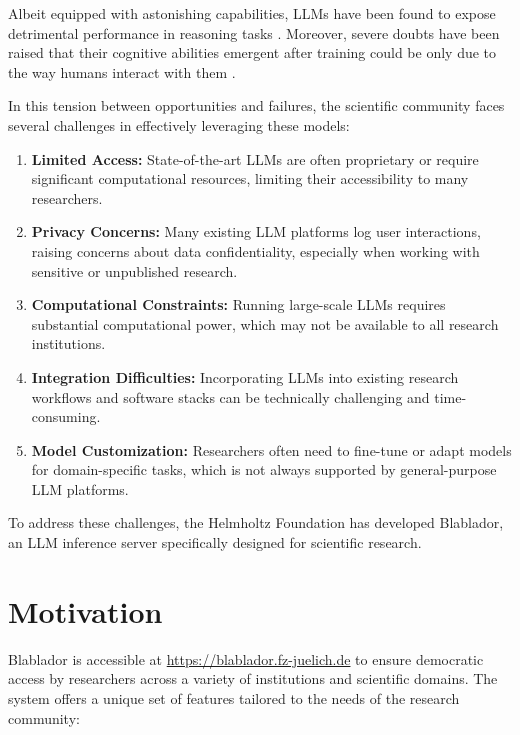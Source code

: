 \documentclass[10pt,conference]{IEEEtran}
\begin{document}
Albeit equipped with astonishing capabilities, LLMs have been found to expose detrimental performance in reasoning tasks \cite{nezhurina2024alicewonderlandsimpletasks}. Moreover, severe doubts have been raised that their cognitive abilities emergent after training could be only due to the way humans interact with them \cite{lu2024emergentabilitieslargelanguage}.

In this tension between opportunities and failures, the scientific community faces several challenges in effectively leveraging these models:

\begin{enumerate}
    \item \textbf{Limited Access:} State-of-the-art LLMs are often proprietary or require significant computational resources, limiting their accessibility to many researchers.
    
    \item \textbf{Privacy Concerns:} Many existing LLM platforms log user interactions, raising concerns about data confidentiality, especially when working with sensitive or unpublished research.
    
    \item \textbf{Computational Constraints:} Running large-scale LLMs requires substantial computational power, which may not be available to all research institutions.
    
    \item \textbf{Integration Difficulties:} Incorporating LLMs into existing research workflows and software stacks can be technically challenging and time-consuming.
    
    \item \textbf{Model Customization:} Researchers often need to fine-tune or adapt models for domain-specific tasks, which is not always supported by general-purpose LLM platforms.
\end{enumerate}

To address these challenges, the Helmholtz Foundation has developed Blablador, an LLM inference server specifically designed for scientific research. 

\section{Motivation}

Blablador is accessible at \url{https://blablador.fz-juelich.de} to ensure democratic access by researchers across a variety of institutions and scientific domains. The system offers a unique set of features tailored to the needs of the research community:
\end{document}
